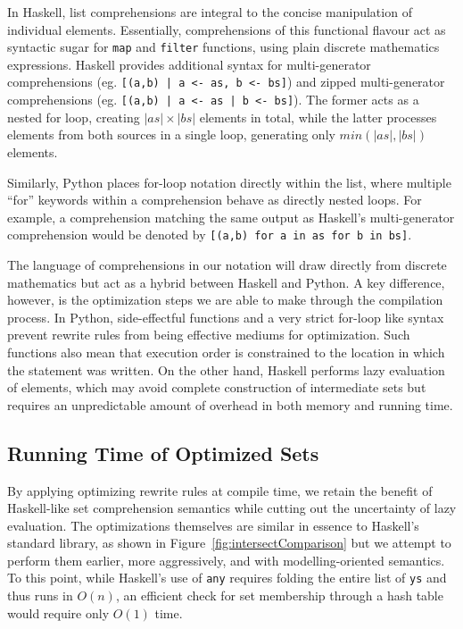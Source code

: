 \documentclass{article}
\begin{document}
In Haskell, list comprehensions are integral to the concise manipulation of individual elements. Essentially, comprehensions of this functional flavour act as syntactic sugar for \texttt{map} and \texttt{filter} functions, using plain discrete mathematics expressions. Haskell provides additional syntax for multi-generator comprehensions (eg. \texttt{[(a,b) | a <- as, b <- bs]}) and zipped multi-generator comprehensions (eg. \texttt{[(a,b) | a <- as | b <- bs]}). The former acts as a nested for loop, creating $|as|\times|bs|$ elements in total, while the latter processes elements from both sources in a single loop, generating only $min(|as|,|bs|)$ elements.

Similarly, Python places for-loop notation directly within the list, where multiple ``for'' keywords within a comprehension behave as directly nested loops. For example, a comprehension matching the same output as Haskell's multi-generator comprehension would be denoted by \texttt{[(a,b) for a in as for b in bs]}.

The language of comprehensions in our notation will draw directly from discrete mathematics but act as a hybrid between Haskell and Python. A key difference, however, is the optimization steps we are able to make through the compilation process. In Python, side-effectful functions and a very strict for-loop like syntax prevent rewrite rules from being effective mediums for optimization. Such functions also mean that execution order is constrained to the location in which the statement was written. On the other hand, Haskell performs lazy evaluation of elements, which may avoid complete construction of intermediate sets but requires an unpredictable amount of overhead in both memory and running time.

\subsection{Running Time of Optimized Sets}

By applying optimizing rewrite rules at compile time, we retain the benefit of Haskell-like set comprehension semantics while cutting out the uncertainty of lazy evaluation. The optimizations themselves are similar in essence to Haskell's standard library, as shown in Figure~\ref{fig:intersectComparison} but we attempt to perform them earlier, more aggressively, and with modelling-oriented semantics. To this point, while Haskell's use of \texttt{any} requires folding the entire list of \texttt{ys} and thus runs in $O(n)$, an efficient check for set membership through a hash table would require only $O(1)$ time.
\end{document}
